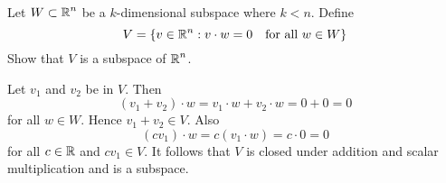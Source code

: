 \documentclass{ximera}
\author{Marty Golubitsky}
\begin{document}
\begin{exercise}\label{c5.2.9B}

Let $W\subset \mbox{$\Bbb{R}$}^n$ be a $k$-dimensional subspace where $k < n$.  Define
\[
V = \{v\in\mbox{$\Bbb{R}$}^n: v\cdot w = 0\quad \mbox{for all $w\in W$} \}
\]
Show that $V$ is a subspace of $\mbox{$\Bbb{R}$}^n$.

  
\begin{solution}



\soln Let $v_1$ and $v_2$ be in $V$.  Then 
\[
(v_1+v_2)\cdot w = v_1\cdot w+ v_2\cdot w = 0 + 0 = 0
\]
for all $w\in W$.  Hence $v_1 + v_2\in V$.  Also
\[
(cv_1)\cdot w = c(v_1\cdot w) = c\cdot 0 = 0
\]
for all $c\in\mbox{$\Bbb{R}$}$ and $cv_1\in V$.  It follows that $V$ is closed under addition and scalar multiplication and is a subspace.
\end{solution}
\end{exercise}
\end{document}

